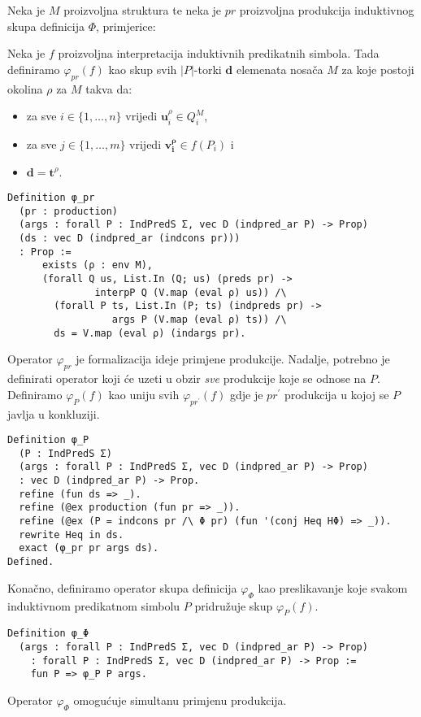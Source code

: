 \begin{definition}
  Neka je \(M\) proizvoljna struktura te neka je \(pr\) proizvoljna produkcija induktivnog skupa definicija \(\Phi\), primjerice:
  \begin{prooftree}
  \end{prooftree}
\noindent Neka je \(f\) proizvoljna interpretacija induktivnih predikatnih simbola.
Tada definiramo \(\varphi_{pr}(f)\) kao skup svih \(|P|\)-torki \(\mathbf{d}\) elemenata nosača \(M\) za koje postoji okolina \(\rho\) za \(M\) takva da:
\begin{itemize}
\item za sve \( i \in \{ 1, \ldots, n \} \) vrijedi \( \mathbf{u}_{i}^{\rho} \in Q_{i}^{M} \), %
\item za sve \( j \in \{ 1, \ldots, m \} \) vrijedi \( \mathbf{v_{i}^{\rho}} \in f(P_{i}) \) i
\item \(\mathbf{d} = \mathbf{t}^{\rho}\).
\end{itemize}
\begin{verbatim}
Definition φ_pr
  (pr : production)
  (args : forall P : IndPredS Σ, vec D (indpred_ar P) -> Prop)
  (ds : vec D (indpred_ar (indcons pr)))
  : Prop :=
      exists (ρ : env M),
      (forall Q us, List.In (Q; us) (preds pr) ->
               interpP Q (V.map (eval ρ) us)) /\
        (forall P ts, List.In (P; ts) (indpreds pr) ->
                  args P (V.map (eval ρ) ts)) /\
        ds = V.map (eval ρ) (indargs pr).
\end{verbatim}
\noindent Operator \(\varphi_{pr}\) je formalizacija ideje primjene produkcije.
Nadalje, potrebno je definirati operator koji će uzeti u obzir \textit{sve} produkcije koje se odnose na \(P\).
Definiramo \(\varphi_{P}(f)\) kao uniju svih \(\varphi_{pr^{\prime}}(f)\)
gdje je \(pr^{\prime}\) produkcija u kojoj se \(P\) javlja u konkluziji.
\begin{verbatim}
Definition φ_P
  (P : IndPredS Σ)
  (args : forall P : IndPredS Σ, vec D (indpred_ar P) -> Prop)
  : vec D (indpred_ar P) -> Prop.
  refine (fun ds => _).
  refine (@ex production (fun pr => _)).
  refine (@ex (P = indcons pr /\ Φ pr) (fun '(conj Heq HΦ) => _)).
  rewrite Heq in ds.
  exact (φ_pr pr args ds).
Defined.
\end{verbatim}
\noindent Konačno, definiramo operator skupa definicija \(\varphi_{\Phi}\) kao preslikavanje
koje svakom induktivnom predikatnom simbolu \(P\) pridružuje skup \(\varphi_{P}(f)\).
\begin{verbatim}
Definition φ_Φ
  (args : forall P : IndPredS Σ, vec D (indpred_ar P) -> Prop)
    : forall P : IndPredS Σ, vec D (indpred_ar P) -> Prop :=
    fun P => φ_P P args.
\end{verbatim}
\noindent Operator \(\varphi_{\Phi}\) omogućuje simultanu primjenu produkcija.
\end{definition}


